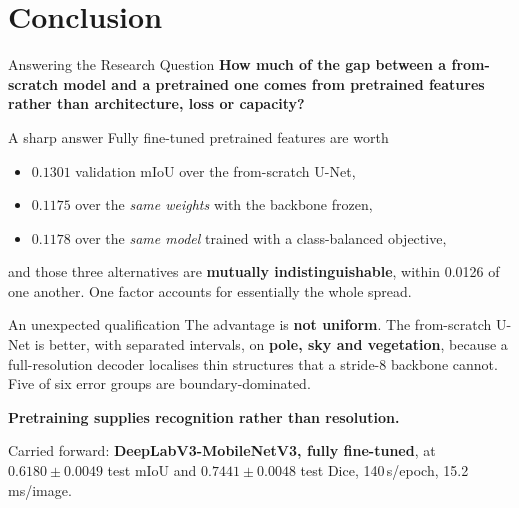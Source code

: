 
\section{Conclusion}

\begin{frame}{Answering the Research Question}
\footnotesize
\textbf{How much of the gap between a from-scratch model and a pretrained one comes from
pretrained features rather than architecture, loss or capacity?}

\begin{block}{A sharp answer}
Fully fine-tuned pretrained features are worth
\begin{itemize}
    \item $\mathbf{0.1301}$ validation mIoU over the from-scratch U-Net,
    \item $\mathbf{0.1175}$ over the \emph{same weights} with the backbone frozen,
    \item $\mathbf{0.1178}$ over the \emph{same model} trained with a class-balanced objective,
\end{itemize}
and those three alternatives are \textbf{mutually indistinguishable}, within 0.0126 of one
another. One factor accounts for essentially the whole spread.
\end{block}

\begin{alertblock}{An unexpected qualification}
The advantage is \textbf{not uniform}. The from-scratch U-Net is better, with separated intervals,
on \textbf{pole, sky and vegetation}, because a full-resolution decoder localises thin structures
that a stride-8 backbone cannot. Five of six error groups are boundary-dominated.

\textbf{Pretraining supplies recognition rather than resolution.}
\end{alertblock}

\vspace{0.1cm}
Carried forward: \textbf{DeepLabV3-MobileNetV3, fully fine-tuned}, at
$\mathbf{0.6180 \pm 0.0049}$ test mIoU and $0.7441 \pm 0.0048$ test Dice, 140\,s/epoch,
15.2\,ms/image.
\end{frame}

